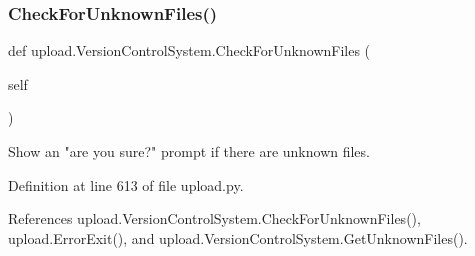 \mbox{\label{classupload_1_1VersionControlSystem_ad2923d691a1b1047e9359c5b7c1c103f}} 
\subsubsection{\texorpdfstring{Check\+For\+Unknown\+Files()}{CheckForUnknownFiles()}\hspace{0.1cm}{\footnotesize\ttfamily [2/2]}}
{\footnotesize\ttfamily def upload.\+Version\+Control\+System.\+Check\+For\+Unknown\+Files (\begin{DoxyParamCaption}\item[{}]{self }\end{DoxyParamCaption})}

\begin{DoxyVerb}Show an "are you sure?" prompt if there are unknown files.\end{DoxyVerb}
 

Definition at line 613 of file upload.\+py.



References upload.\+Version\+Control\+System.\+Check\+For\+Unknown\+Files(), upload.\+Error\+Exit(), and upload.\+Version\+Control\+System.\+Get\+Unknown\+Files().


